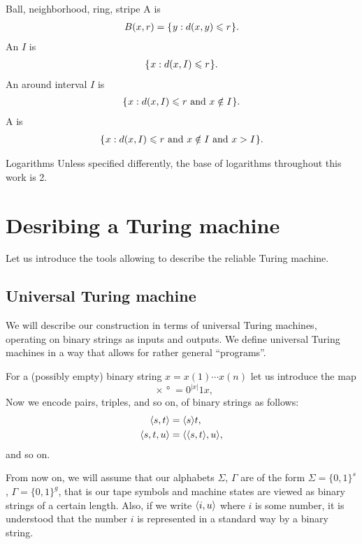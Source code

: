 \documentclass[12pt]{memoir}
\begin{document}
\begin{flushdescription}
\item [Ball, neighborhood, ring, stripe]
A  is
\begin{align*}
    B(x,r)= \mathopen\{\mskip 1mu y : d(x,y)\leqslant r\mskip 1mu\mathclose\}.
\end{align*}
An  \( I \) is
\begin{align*}
    \mathopen\{\mskip 1mu x : d(x,I)\leqslant r\mskip 1mu\mathclose\}.
\end{align*}
An  around interval \( I \) is
\begin{align*}
    \mathopen\{\mskip 1mu x : d(x,I)\leqslant r \text{\rmfamily\mdseries\upshape{ and }} x \notin I\mskip 1mu\mathclose\}.
\end{align*}
A  is
\begin{align*}
    \mathopen\{\mskip 1mu x : d(x,I)\leqslant r \text{\rmfamily\mdseries\upshape{ and }} x \notin I \text{\rmfamily\mdseries\upshape{ and }} x>I\mskip 1mu\mathclose\}.
\end{align*}

\item[Logarithms] Unless specified differently,
the base of logarithms throughout this work is 2.

\end{flushdescription}


\section{Desribing a Turing machine}\label{sec:describing}

Let us introduce the tools allowing to describe the reliable Turing machine.

\subsection{Universal Turing machine}\label{sec:UTM}

We will describe our construction in terms of
universal Turing machines,
operating on binary strings as inputs and outputs.
We define universal Turing machines in a way that allows
for rather general ``programs''.

 \begin{definition}
For a (possibly empty) binary string \( x=x(1)\dotsm x(n) \) let us introduce the map
 \[
   \ang{x} = 0^{|x|}1 x,
 \]
Now we encode pairs, triples, and so on, of binary strings as follows:
 \begin{align*}
        {\mathopen\langle s,t\mathclose\rangle} &={\mathopen\langle s\mathclose\rangle}t,
\\ {\mathopen\langle s,t,u\mathclose\rangle} &= {\mathopen\langle {\mathopen\langle s,t\mathclose\rangle},u\mathclose\rangle},
 \end{align*}
and so on.

From now on, we will assume that our alphabets \( \Sigma \), \( \Gamma \)
are of the form \( \Sigma=\{0,1\}^{s} \), \( \Gamma=\{0,1\}^{g} \), that is 
our tape symbols and machine states are viewed as binary strings of a certain length.
Also, if we write \( {\mathopen\langle i,u\mathclose\rangle} \) where \( i \) is some number, it is understood
that the number \( i \) is represented in a standard way by a binary string.
\end{definition}
\end{document}
